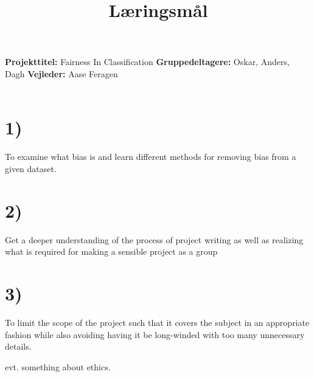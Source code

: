 \documentclass[11pt, fleqn]{article}
\title{Læringsmål}
\date{}
\begin{document}
	\maketitle
	\noindent
	\vspace*{-1.4cm}
	\noindent
	\textbf{Projekttitel:} Fairness In Classification \newline \noindent
	\textbf{Gruppedeltagere:} Oskar, Anders, Dagh \newline  \noindent
	\textbf{Vejleder:} Aase Feragen \noindent
	\\\\
	\section*{1)}
	To examine what bias is and learn different methods for removing bias from a given dataset.
	\section*{2)}
	Get a deeper understanding of the process of project writing as well as realizing what is required for making a sensible project as a group
	
	\section*{3)}
	To limit the scope of the project such that it covers the subject in an appropriate fashion while also avoiding having it be long-winded with too many unnecessary details.
	
	evt. something about ethics.
	
\end{document}
